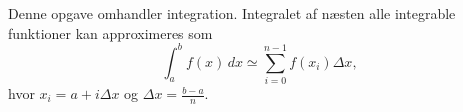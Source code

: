 Denne opgave omhandler integration. Integralet af næsten alle integrable funktioner kan approximeres som $$\int_a^bf(x)\,dx\simeq\sum_{i=0}^{n-1}f(x_i)\Delta x,$$ hvor $x_i = a + i\Delta x$ og $\Delta x = \frac{b-a}{n}$.
